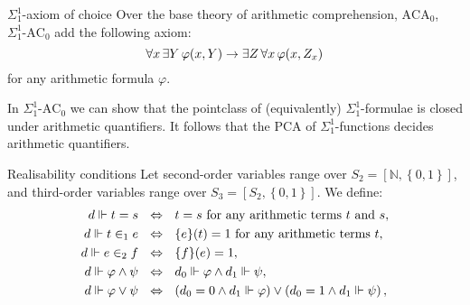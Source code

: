 \documentclass{beamer}
\theoremstyle{definition}
\newcommand{\SigAC}{\Sigma^1_1\text{-}\mathrm{AC}}
\begin{document}
\begin{frame}{$\Sigma^1_1$-axiom of choice}
  Over the base theory of arithmetic comprehension, $\mathrm{ACA}_0$, $\SigAC_0$ add the following axiom:
  \[\forall x \, \exists Y \, \varphi\mleft(x, Y\mright) \rightarrow \exists Z \, \forall x \, \varphi\mleft(x, Z_x\mright)\]
  for any arithmetic formula $\varphi$.

  \vspace{1em}

  In $\SigAC_0$ we can show that the pointclass of (equivalently) $\Sigma^1_1$-formulae is closed under arithmetic quantifiers. It follows that the PCA of $\Sigma^1_1$-functions decides arithmetic quantifiers.
\end{frame}

\begin{frame}{Realisability conditions}
  \vspace{0.4em}
  Let second-order variables range over $S_2 = \left[\mathbb{N}, \left\{0, 1\right\}\right]$, and third-order variables range over $S_3 = \left[S_2, \left\{0, 1\right\}\right]$. We define:
  \vspace{-0.5em}
  {\scriptsize
    \begin{align*}
      d \Vdash t = s \ \                                                   & \Leftrightarrow \ \ t = s \text{ for any arithmetic terms $t$ and $s$},                                                                                          \\
      d \Vdash t \in_1 e \ \                                               & \Leftrightarrow \ \ \mleft\{e\mright\}\mleft(t\mright) = 1 \text{ for any arithmetic terms $t$},                                                                 \\
      d \Vdash e \in_2 f \ \                                               & \Leftrightarrow \ \ \mleft\{f\mright\}\mleft(e\mright) = 1,                                                                                                      \\
      d \Vdash \varphi \land \psi \ \                                      & \Leftrightarrow \ \ d_0 \Vdash \varphi \land d_1 \Vdash \psi,                                                                                                    \\
      d \Vdash \varphi \lor \psi \ \                                       & \Leftrightarrow \ \ \left(d_0 = 0 \land d_1 \Vdash \varphi\right) \lor \left(d_0 = 1 \land d_1 \Vdash \psi\right),                                               \\

\end{align*}}
\end{frame}
\end{document}
